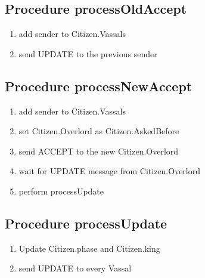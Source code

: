 \documentclass{article}
\begin{document}
\subsection*{Procedure processOldAccept}
    \begin{enumerate}
        \item add sender to Citizen.Vassals
        \item send UPDATE to the previous sender
    \end{enumerate}

\subsection*{Procedure processNewAccept}
\begin{enumerate}
        \item add sender to Citizen.Vassals
        \item set Citizen.Overlord as Citizen.AskedBefore 
        \item send ACCEPT to the new Citizen.Overlord
        \item wait for UPDATE message from Citizen.Overlord
        \item perform processUpdate
    \end{enumerate}

\subsection*{Procedure processUpdate}
    \begin{enumerate}
        \item Update Citizen.phase and Citizen.king
        \item send UPDATE to every Vassal
    \end{enumerate}
\end{document}
